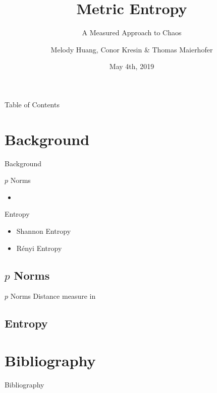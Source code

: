 \documentclass{beamer}
\title[STATS 200C Project Presentation]{Metric Entropy}
\subtitle{A Measured Approach to Chaos}
\author[Huang, Kresin \& Maierhofer]{
  Melody Huang, Conor Kresin \& Thomas Maierhofer\\
  \vspace{0.5cm}
}
\institute[]{Department of Statistics \\
  University of California, Los Angeles}
\date{May 4th, 2019}
\newcommand{\1}{\mathbb{1}}
\begin{document}
\begin{frame}
  \titlepage
\end{frame}


\begin{frame}{Table of Contents}
  \tableofcontents
\end{frame}

\section{Background}
\begin{frame} {Background}
    \begin{block}{$p$ Norms}
    \begin{itemize}
        \item 
    \end{itemize}
    \end{block}
    \begin{block}{Entropy}
    \begin{itemize}
        \item Shannon Entropy
        \item R\'enyi Entropy
    \end{itemize}
    \end{block}
\end{frame}

\subsection{$p$ Norms}
\begin{frame} {$p$ Norms}
    Distance measure in 
\end{frame}


\subsection{Entropy}




\section*{Bibliography}
\begin{frame}{Bibliography}
   
  \small{}
\end{frame}

\nocite{maierhoferCoFD}
\end{document}
